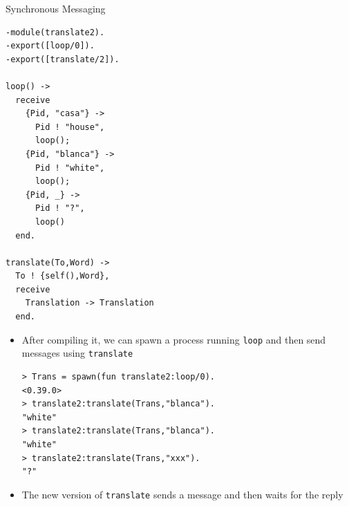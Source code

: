 \documentclass[12pt,xcolor=svgnames]{beamer}
\begin{document}
\begin{frame}{Synchronous Messaging}
\framebreak

\begin{Verbatim}
-module(translate2).
-export([loop/0]).
-export([translate/2]).

loop() ->
  receive
    {Pid, "casa"} -> 
      Pid ! "house",      
      loop();
    {Pid, "blanca"} -> 
      Pid ! "white",      
      loop();
    {Pid, _} -> 
      Pid ! "?",		
      loop()			
  end.				

translate(To,Word) ->
  To ! {self(),Word},
  receive
    Translation -> Translation
  end.
\end{Verbatim}

\framebreak

\begin{itemize}
\item After compiling it, we can spawn a process running \texttt{loop} and then 
send messages using \texttt{translate}
\begin{Verbatim}
> Trans = spawn(fun translate2:loop/0).
<0.39.0>
> translate2:translate(Trans,"blanca").
"white"
> translate2:translate(Trans,"blanca").
"white"
> translate2:translate(Trans,"xxx").   
"?"
\end{Verbatim}
\item The new version of \texttt{translate} sends a message and then waits for the reply
\end{itemize}
\end{frame}
\end{document}
